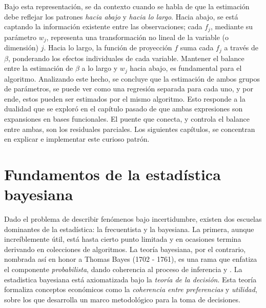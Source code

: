 \documentclass[../Main/Main.tex]{subfiles}
\begin{document}
Bajo esta representación, se da contexto cuando se habla de que la estimación debe reflejar los patrones \textit{hacia abajo} y \textit{hacia lo largo}. Hacia abajo, se está captando la información existente entre las observaciones;  cada $f_j$, mediante su parámetro $w_j$, representa una transformación no lineal de la variable (o dimensión) $j$. Hacia lo largo, la función de proyección $f$ suma cada $f_j$ a través de $\beta$, ponderando los efectos individuales de cada variable. Mantener el balance entre la estimación de $\beta$ a lo largo y $w_j$ hacia abajo, es fundamental para el algoritmo. Analizando este hecho, se concluye que la estimación de ambos grupos de parámetros, se puede ver como una regresión separada para cada uno, y por ende, estos pueden ser estimados por el mismo algoritmo. Esto responde a la dualidad que se exploró en el capítulo pasado de que ambas expresiones son expansiones en bases funcionales. El puente que conecta, y controla el balance entre ambas, son los residuales parciales. Los siguientes capítulos, se concentran en explicar e implementar este curioso patrón. 

\section{Fundamentos de la estadística bayesiana}
Dado el problema de describir fenómenos bajo incertidumbre, existen dos escuelas dominantes de la estadística: la frecuentista y la bayesiana. La primera, aunque increíblemente útil, está hasta cierto punto limitada y en ocasiones termina derivando en colecciones de algoritmos. La teoría bayesiana, por el contrario, nombrada así en honor a Thomas Bayes (1702 - 1761), es una rama que enfatiza el componente \textit{probabilista}, dando coherencia al proceso de inferencia \autocite{mendoza2011estadistica} y \autocite{bernardo2001bayesian}. La estadistica bayesiana está  axiomatizada bajo la \textit{teoría de la decisión}. Esta teoría formaliza conceptos económicos como la \textit{coherencia entre preferencias} y \textit{utilidad}, sobre los que desarrolla un marco metodológico para la toma de decisiones. 
\end{document}
